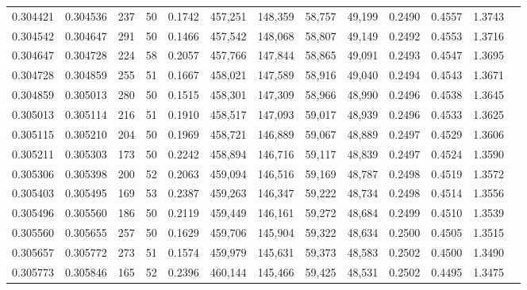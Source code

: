 \begin{tabular}{rrrrrrrrrrrrr}
0.304421 & 0.304536 &   237 &  50 &                                     0.1742 & 457,251 & 148,359 &  58,757 &  49,199 & 0.2490 & 0.4557 & 1.3743 \\
0.304542 & 0.304647 &   291 &  50 &                                     0.1466 & 457,542 & 148,068 &  58,807 &  49,149 & 0.2492 & 0.4553 & 1.3716 \\
0.304647 & 0.304728 &   224 &  58 &                                     0.2057 & 457,766 & 147,844 &  58,865 &  49,091 & 0.2493 & 0.4547 & 1.3695 \\
0.304728 & 0.304859 &   255 &  51 &                                     0.1667 & 458,021 & 147,589 &  58,916 &  49,040 & 0.2494 & 0.4543 & 1.3671 \\
0.304859 & 0.305013 &   280 &  50 &                                     0.1515 & 458,301 & 147,309 &  58,966 &  48,990 & 0.2496 & 0.4538 & 1.3645 \\
0.305013 & 0.305114 &   216 &  51 &                                     0.1910 & 458,517 & 147,093 &  59,017 &  48,939 & 0.2496 & 0.4533 & 1.3625 \\
0.305115 & 0.305210 &   204 &  50 &                                     0.1969 & 458,721 & 146,889 &  59,067 &  48,889 & 0.2497 & 0.4529 & 1.3606 \\
0.305211 & 0.305303 &   173 &  50 &                                     0.2242 & 458,894 & 146,716 &  59,117 &  48,839 & 0.2497 & 0.4524 & 1.3590 \\
0.305306 & 0.305398 &   200 &  52 &                                     0.2063 & 459,094 & 146,516 &  59,169 &  48,787 & 0.2498 & 0.4519 & 1.3572 \\
0.305403 & 0.305495 &   169 &  53 &                                     0.2387 & 459,263 & 146,347 &  59,222 &  48,734 & 0.2498 & 0.4514 & 1.3556 \\
0.305496 & 0.305560 &   186 &  50 &                                     0.2119 & 459,449 & 146,161 &  59,272 &  48,684 & 0.2499 & 0.4510 & 1.3539 \\
0.305560 & 0.305655 &   257 &  50 &                                     0.1629 & 459,706 & 145,904 &  59,322 &  48,634 & 0.2500 & 0.4505 & 1.3515 \\
0.305657 & 0.305772 &   273 &  51 &                                     0.1574 & 459,979 & 145,631 &  59,373 &  48,583 & 0.2502 & 0.4500 & 1.3490 \\
0.305773 & 0.305846 &   165 &  52 &                                     0.2396 & 460,144 & 145,466 &  59,425 &  48,531 & 0.2502 & 0.4495 & 1.3475 \\

\end{tabular}
